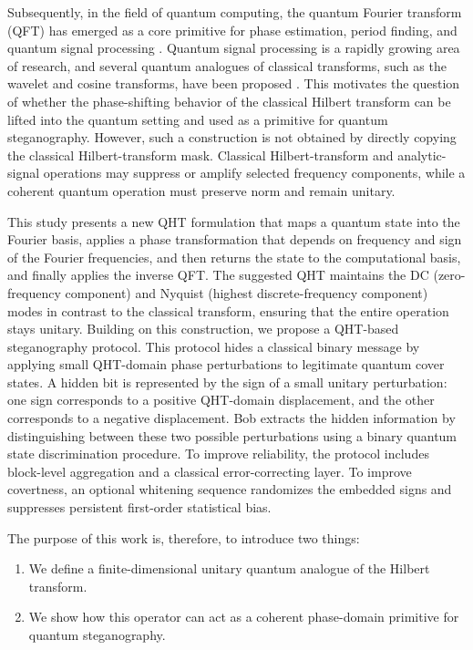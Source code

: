 \documentclass[11pt]{article}
\theoremstyle{plain}
\theoremstyle{definition}
\theoremstyle{remark}
\begin{document}
Subsequently, in the field of quantum computing, the quantum Fourier transform (QFT) has emerged as a core primitive for phase estimation, period finding, and quantum signal processing \citep{shor1999polynomial,zhouquant2017}. Quantum signal processing is a rapidly growing area of research, and several quantum analogues of classical transforms, such as the wavelet and cosine transforms, have been proposed \citep{pang2019signal,yin2021quantum,motlagh2024generalized}. This motivates the question of whether the phase-shifting behavior of the classical Hilbert transform can be lifted into the quantum setting and used as a primitive for quantum steganography. However, such a construction is not obtained by directly copying the classical Hilbert-transform mask. Classical Hilbert-transform and analytic-signal operations may suppress or amplify selected frequency components, while a coherent quantum operation must preserve norm and remain unitary.

This study presents a new QHT formulation that maps a quantum state into the Fourier basis, applies a phase transformation that depends on frequency and sign of the Fourier frequencies, and then returns the state to the computational basis, and finally applies the inverse QFT. The suggested QHT maintains the DC (zero-frequency component) and Nyquist (highest discrete-frequency component) modes in contrast to the classical transform, ensuring that the entire operation stays unitary. Building on this construction, we propose a QHT-based steganography protocol. This protocol hides a classical binary message by applying small QHT-domain phase perturbations to legitimate quantum cover states. A hidden bit is represented by the sign of a small unitary perturbation: one sign corresponds to a positive QHT-domain displacement, and the other corresponds to a negative displacement. Bob extracts the hidden information by distinguishing between these two possible perturbations using a binary quantum state discrimination procedure. To improve reliability, the protocol includes block-level aggregation and a classical error-correcting layer. To improve covertness, an optional whitening sequence randomizes the embedded signs and suppresses persistent first-order statistical bias.

\noindent
The purpose of this work is, therefore, to introduce two things:

\begin{enumerate}
    \item We define a finite-dimensional unitary quantum analogue of the Hilbert transform.
    \item We show how this operator can act as a coherent phase-domain primitive for quantum steganography.
\end{enumerate}
\end{document}
